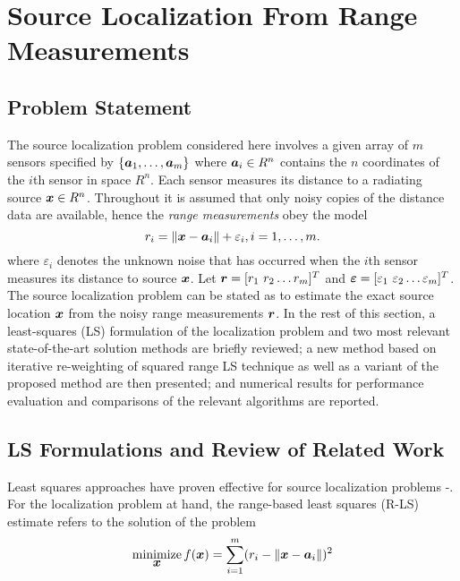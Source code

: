 \section{Source Localization From Range Measurements}%
\subsection{Problem Statement}%

The source localization problem considered here involves a given array of $m$ sensors specified by $\{\mbox{\boldmath$a$}_1,\ldots, \mbox{\boldmath$a$}_m\}$ where $\mbox{\boldmath$a$}_i\in R^n$  contains the $n$ coordinates of the $i$th sensor in space $R^n$. Each sensor measures its distance to a radiating source $\mbox{\boldmath$x$}\in R^n$. Throughout it is assumed that only noisy copies of the distance data are available, hence the \textit{range measurements} obey the model
\begin{equation} \label{eq:1}
\setcounter{equation}{1}
r_i = \|{\Bx} - {\Ba}_i\| + \varepsilon_i, i = 1,\ldots , m.
\end{equation}                                                                                                     	where $\varepsilon_i$ denotes the unknown noise that has occurred when the $i$th sensor measures its distance to source $\mbox{\boldmath$x$}$. Let $\mbox{\boldmath$r$}=[r_1 \ r_2 \ldots r_m]^T$ and $\mbox{\boldmath${\varepsilon}$}=[\varepsilon_1 \ \varepsilon_2 \ldots \varepsilon_m]^T$. The source localization problem can be stated as to estimate the exact source location $\mbox{\boldmath$x$}$ from the noisy range measurements $\mbox{\boldmath$r$}$. In the rest of this section, a least-squares (LS) formulation of the localization problem and two most relevant state-of-the-art solution methods are briefly reviewed; a new method based on iterative re-weighting of squared range LS technique as well as a variant of the proposed method are then presented; and numerical results for performance evaluation and comparisons of the relevant algorithms are reported.

\subsection{LS Formulations and Review of Related Work} %

Least squares approaches have proven effective for source localization problems \cite{SmithAbel} -\cite{BeckStLi}. For the localization problem at hand, the range-based least squares (R-LS) estimate refers to the solution of the problem
\begin{equation}\label{eq:2} %
\Min_{\Bx} f(\Bx)=\sum_{i=1}^{m} (r_i - \|{\Bx} - {\Ba}_i\|)^2
\end{equation}

